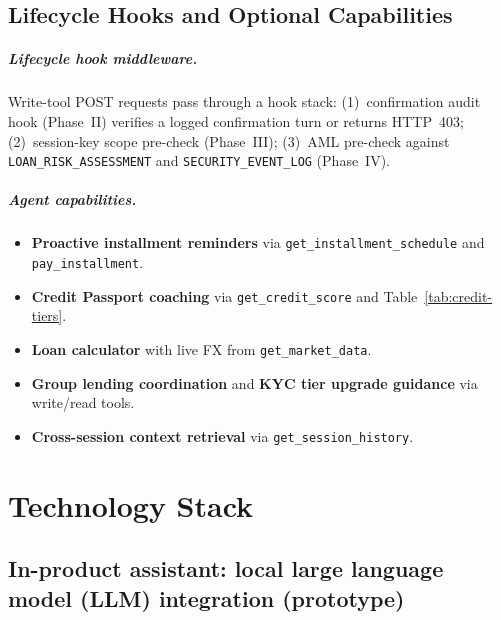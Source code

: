 \documentclass[12pt,a4paper]{report}
\begin{document}
\section{Lifecycle Hooks and Optional Capabilities}

\paragraph{Lifecycle hook middleware.}
Write-tool POST requests pass through a hook stack: (1)~confirmation audit hook (Phase~II) verifies a logged confirmation turn or returns HTTP~403; (2)~session-key scope pre-check (Phase~III); (3)~AML pre-check against \texttt{LOAN\_RISK\_ASSESSMENT} and \texttt{SECURITY\_EVENT\_LOG} (Phase~IV).

\paragraph{Agent capabilities.}
\begin{itemize}[noitemsep]
\item \textbf{Proactive installment reminders} via \texttt{get\_installment\_schedule} and \texttt{pay\_installment}.
\item \textbf{Credit Passport coaching} via \texttt{get\_credit\_score} and Table~\ref{tab:credit-tiers}.
\item \textbf{Loan calculator} with live FX from \texttt{get\_market\_data}.
\item \textbf{Group lending coordination} and \textbf{KYC tier upgrade guidance} via write/read tools.
\item \textbf{Cross-session context retrieval} via \texttt{get\_session\_history}.
\end{itemize}

\chapter{Technology Stack}

\section{In-product assistant: local large language model (LLM) integration (prototype)}
\label{sec:local-llm}
\end{document}
